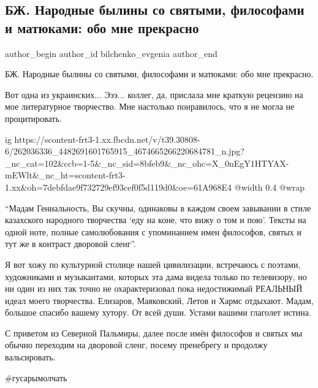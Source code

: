 
 
 
 
 
 
\subsection{БЖ. Народные былины со святыми, философами и матюками: обо мне прекрасно}
\label{sec:27_11_2021.fb.bilchenko_evgenia.1.obo_mne_prekrasno}
 
\ifcmt
 author_begin
   author_id bilchenko_evgenia
 author_end
\fi

БЖ. Народные былины со святыми, философами и матюками: обо мне прекрасно.

Вот одна из украинских... Эээ... коллег, да, прислала мне краткую рецензию на
мое литературное творчество. Мне настолько понравилось, что я не могла не
процитировать. 

\ifcmt
  ig https://scontent-frt3-1.xx.fbcdn.net/v/t39.30808-6/262036336_4482691601765915_4674665266220684781_n.jpg?_nc_cat=102&ccb=1-5&_nc_sid=8bfeb9&_nc_ohc=X_0nEgY1HTYAX-mEWlt&_nc_ht=scontent-frt3-1.xx&oh=7debfdae9f732729ef93cef0f5d119d0&oe=61A968E4
  @width 0.4
  @wrap 
\fi

\enquote{Мадам Гениальность, Вы скучны, одинаковы в каждом своем завывании в стиле
казахского народного творчества \enquote{еду на коне, что вижу о том и пою}. Тексты на
одной ноте, полные самолюбования с упоминанием  имен философов, святых  и тут
же в контраст дворовой сленг}.

Я вот хожу по культурной столице нашей цивилизации, встречаюсь с поэтами,
художниками и музыкантами, которых эта дама видела только по телевизору, но ни
один из них так точно не охарактеризовал пока недостижимый РЕАЛЬНЫЙ идеал моего
творчества. Елизаров, Маяковский, Летов и Хармс отдыхают. Мадам, большое
спасибо вашему хутору. От всей души. Устами вашими глаголет истина. 

С приветом из Северной Пальмиры, далее после имён философов и святых мы обычно
переходим на дворовой сленг, посему пренебрегу и продолжу вальсировать.

\#гусарымолчать

